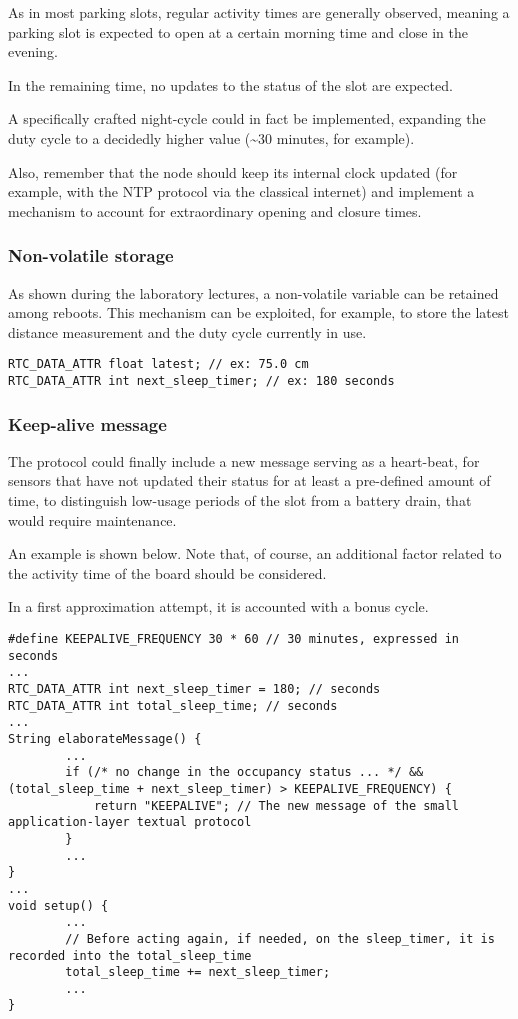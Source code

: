 \documentclass[a4paper,11pt]{article} %
\begin{document}
    As in most parking slots, regular activity times are generally observed, meaning a parking slot is expected to open at a certain morning time and close in the evening.

    In the remaining time, no updates to the status of the slot are expected.

    A specifically crafted night-cycle could in fact be implemented, expanding the duty cycle to a decidedly higher value (\sim 30 minutes, for example).

    Also, remember that the node should keep its internal clock updated (for example, with the NTP protocol via the classical internet) and implement a mechanism to account for extraordinary opening and closure times.

    \subsubsection{Non-volatile storage}

    As shown during the laboratory lectures, a non-volatile variable can be retained among reboots.
    This mechanism can be exploited, for example, to store the latest distance measurement and the duty cycle currently in use.

    \begin{verbatim}
RTC_DATA_ATTR float latest; // ex: 75.0 cm
RTC_DATA_ATTR int next_sleep_timer; // ex: 180 seconds
    \end{verbatim}

    \subsubsection{Keep-alive message}

    The protocol could finally include a new message serving as a heart-beat, for sensors that have not updated their status for at least a pre-defined amount of time, to distinguish
    low-usage periods of the slot from a battery drain, that would require maintenance.

    An example is shown below.
    Note that, of course, an additional factor related to the activity time of the board should be considered.

    In a first approximation attempt, it is accounted with a bonus cycle.

    \begin{verbatim}
#define KEEPALIVE_FREQUENCY 30 * 60 // 30 minutes, expressed in seconds
...
RTC_DATA_ATTR int next_sleep_timer = 180; // seconds
RTC_DATA_ATTR int total_sleep_time; // seconds
...
String elaborateMessage() {
        ...
        if (/* no change in the occupancy status ... */ && (total_sleep_time + next_sleep_timer) > KEEPALIVE_FREQUENCY) {
            return "KEEPALIVE"; // The new message of the small application-layer textual protocol
        }
        ...
}
...
void setup() {
        ...
        // Before acting again, if needed, on the sleep_timer, it is recorded into the total_sleep_time
        total_sleep_time += next_sleep_timer;
        ...
}
    \end{verbatim}
\end{document}
